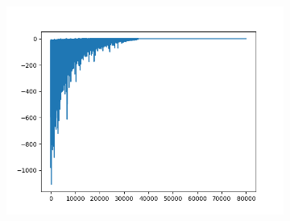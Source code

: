 \begin{figure}[H]
\begin{subfigure}{.25\textwidth}
	\end{subfigure}%
	\begin{subfigure}{.25\textwidth}
		\includegraphics[width=\textwidth]{img/train/matrice_11-11_34_52.png}
	\end{subfigure}%


\end{figure}
